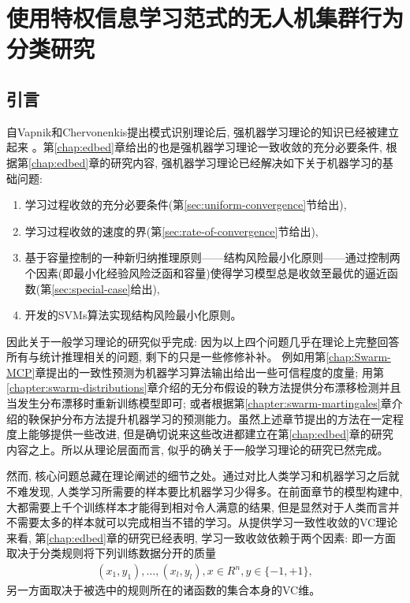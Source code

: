 \chapter{使用特权信息学习范式的无人机集群行为分类研究}
\label{chap:intelligent-learning}

\section{引言}
自Vapnik和Chervonenkis提出模式识别理论后\citep{vapnik1974}, 强机器学习理论的知识已经被建立起来 \citep{vapnik1974,vapnik1979,vapnik1982,vapnik1995,vapnik1998,Vapnik2006,Chervonenkis2013}。第\ref{chap:edbed}章给出的也是强机器学习理论一致收敛的充分必要条件, 根据第\ref{chap:edbed}章的研究内容, 强机器学习理论已经解决如下关于机器学习的基础问题:
\begin{enumerate}
\item 学习过程收敛的充分必要条件(第\ref{sec:uniform-convergence}节给出),
\item 学习过程收敛的速度的界(第\ref{sec:rate-of-convergence}节给出),
\item 基于容量控制的一种新归纳推理原则——结构风险最小化原则——通过控制两个因素(即最小化经验风险泛函和容量)使得学习模型总是收敛至最优的逼近函数(第\ref{sec:special-case}给出),
\item 开发的SVMs算法实现结构风险最小化原则。
\end{enumerate}

因此关于一般学习理论的研究似乎完成: 因为以上四个问题几乎在理论上完整回答所有与统计推理相关的问题, 剩下的只是一些修修补补。 例如用第\ref{chap:Swarm-MCP}章提出的一致性预测为机器学习算法输出给出一些可信程度的度量; 用第\ref{chapter:swarm-distributions}章介绍的无分布假设的鞅方法提供分布漂移检测并且当发生分布漂移时重新训练模型即可; 或者根据第\ref{chapter:swarm-martingales}章介绍的鞅保护分布方法提升机器学习的预测能力。虽然上述章节提出的方法在一定程度上能够提供一些改进, 但是确切说来这些改进都建立在第\ref{chap:edbed}章的研究内容之上。所以从理论层面而言, 似乎的确关于一般学习理论的研究已然完成。

然而, 核心问题总藏在理论阐述的细节之处\citep{Vapnik-similary-2015,Vapnik2021}。通过对比人类学习和机器学习之后就不难发现, 人类学习所需要的样本要比机器学习少得多。在前面章节的模型构建中, 大都需要上千个训练样本才能得到相对令人满意的结果, 但是显然对于人类而言并不需要太多的样本就可以完成相当不错的学习。从提供学习一致性收敛的VC理论来看, 第\ref{chap:edbed}章的研究已经表明, 学习一致收敛依赖于两个因素: 即一方面取决于分类规则将下列训练数据分开的质量
\begin{align}
\label{ch4:train-data}
(x_{1}, y_{1}), \ldots, (x_{l}, y_{l}), x \in R^{n}, y \in \{-1, +1\},
\end{align}
另一方面取决于被选中的规则所在的诸函数的集合本身的VC维。

